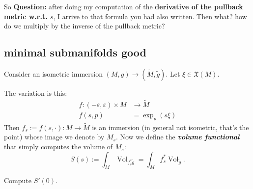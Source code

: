 So \textbf{Question:} after doing my computation of the \textbf{derivative of the pullback metric w.r.t. \(s\)}, I arrive to that formula you had also written. Then what? how do we multiply by the inverse of the pullback metric?
\fi



\subsection{minimal submanifolds good}

Consider an isometric immersion \((M,g) \to(\tilde{M},\tilde{g})\). Let  \(\xi \in\mathfrak{X}(M)\). 

The variation is this:
\begin{align*}
	f: (-\varepsilon,\varepsilon)\times M &\longrightarrow \tilde{M} \\
	f(s,p) &=\operatorname{exp}_{p}(s \xi)
\end{align*}
Then \(f_s:=f(s,\cdot):M \longrightarrow \tilde{M}\) is an immersion (in general not isometric, that's the point) whose image we denote by \(M_s\). Now we define the \textit{\textbf{volume functional}} that simply computes the volume of \(M_s\):
\[S(s):= \int_{M}\operatorname{Vol}_{f_s ^*\tilde{g}}=\int_M f_s^*\operatorname{Vol}_{\tilde{g}}.\]

\begin{exercise}\leavevmode
Compute \(S'(0)\).
\end{exercise}

